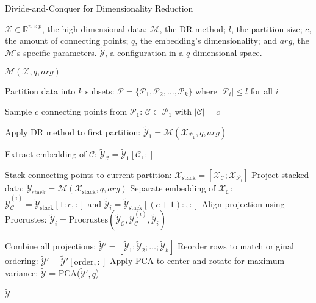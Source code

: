 \begin{algorithm}
    \caption{Divide-and-Conquer for Dimensionality Reduction}
    \label{alg:DivideConquer}
    
    \begin{algorithmic}[1]
    \REQUIRE $\mathcal{X} \in \mathbb{R}^{n \times p}$, the high-dimensional data; $\mathcal{M}$, the DR method; $l$, the partition size; $c$, the amount of connecting points; $q$, the embedding's dimensionality; and $arg$, the $\mathcal{M}$'s specific parameters.
    \ENSURE $\tilde{\mathcal{Y}}$, a configuration in a $q$-dimensional space.
    
        \RETURN $\mathcal{M}(\mathcal{X}, q, arg)$
    \ENDIF
    
    \STATE Partition data into $k$ subsets: $\mathcal{P} = \{\mathcal{P}_1, \mathcal{P}_2, \ldots, \mathcal{P}_k\}$ where $|\mathcal{P}_i| \leq l$ for all $i$
    
    \STATE Sample $c$ connecting points from $\mathcal{P}_1$: $\mathcal{C} \subset \mathcal{P}_1$ with $|\mathcal{C}| = c$
    
    \STATE Apply DR method to first partition: $\tilde{\mathcal{Y}}_1 = \mathcal{M}(\mathcal{X}_{\mathcal{P}_1}, q, arg)$

    \STATE Extract embedding of $\mathcal{C}$: $\tilde{\mathcal{Y}}_\mathcal{C} = \tilde{\mathcal{Y}}_1[{\mathcal{C}},:]$
    
        \STATE Stack connecting points to current partition: $\mathcal{X}_{\text{stack}} = [\mathcal{X}_{\mathcal{C}}; \mathcal{X}_{\mathcal{P}_i}]$
        \STATE Project stacked data: $\tilde{\mathcal{Y}}_{\text{stack}} = \mathcal{M}(\mathcal{X}_{\text{stack}}, q, arg)$
        \STATE Separate embedding of $\mathcal{X}_{\mathcal{C}}$: $\tilde{\mathcal{Y}}_{\mathcal{C}}^{(i)} = \tilde{\mathcal{Y}}_{\text{stack}}[1:c,:]$ and $\tilde{\mathcal{Y}}_i = \tilde{\mathcal{Y}}_{\text{stack}}[(c+1):,:]$
        \STATE Align projection using Procrustes: $\tilde{\mathcal{Y}}_i = \text{Procrustes}(\tilde{\mathcal{Y}}_\mathcal{C}, \tilde{\mathcal{Y}}_{\mathcal{C}}^{(i)}, \tilde{\mathcal{Y}}_i)$
    \ENDFOR
    
    \STATE Combine all projections: $\tilde{\mathcal{Y}}' = [\tilde{\mathcal{Y}}_1; \tilde{\mathcal{Y}}_2; \ldots; \tilde{\mathcal{Y}}_k]$
    \STATE Reorder rows to match original ordering: $\tilde{\mathcal{Y}}' = \tilde{\mathcal{Y}}'[\text{order},:]$
    \STATE Apply PCA to center and rotate for maximum variance: $\tilde{\mathcal{Y}}$ = PCA($\tilde{\mathcal{Y}}', q$)
    
    \RETURN $\tilde{\mathcal{Y}}$
    \end{algorithmic}
\end{algorithm}

